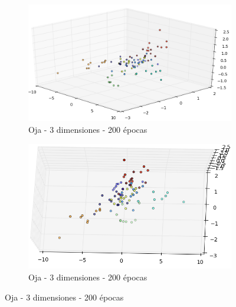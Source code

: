 \begin{figure}[!htbp]
\centering
\begin{subfigure}{.5\textwidth}
  \centering
  \includegraphics[width=1\linewidth, scale=1]{../img/ej1/oja/oja_3salida_200ep_validation.png}
  \caption{Oja - 3 dimensiones - 200 épocas}
  \label{fig:sub1}
\end{subfigure}%
\begin{subfigure}{.5\textwidth}
  \centering
  \includegraphics[width=1\linewidth, scale=1]{../img/ej1/oja/oja_3salida_200ep_validation_3.png}
  \caption{Oja - 3 dimensiones - 200 épocas}
  \label{fig:sub2}
\end{subfigure}
\end{figure}

